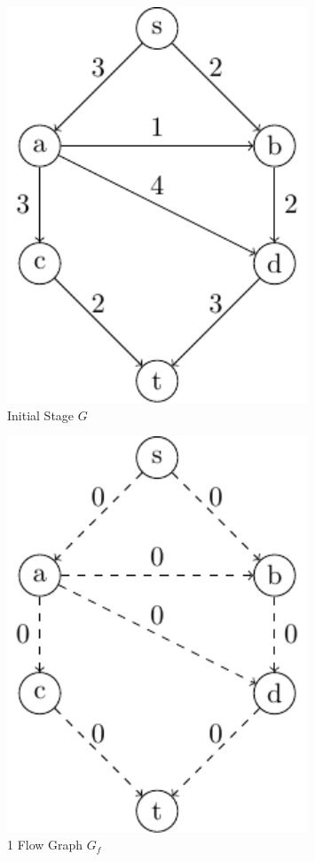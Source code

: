 \begin{minipage}{0.2\textwidth}
\begin{figure}[H]
  \centering
  \includegraphics[width=0.8\textwidth]{Figure/maxflow_d2_1.pdf}
  \caption*{Initial Stage \(G\)}
\end{figure}
\end{minipage}
\begin{minipage}{0.2\textwidth}
\begin{figure}[H]
  \centering
  \includegraphics[width=0.8\textwidth]{Figure/maxflow_d2_2.pdf}
  \caption*{1 Flow Graph \(G_f\)}
\end{figure}
\end{minipage}
